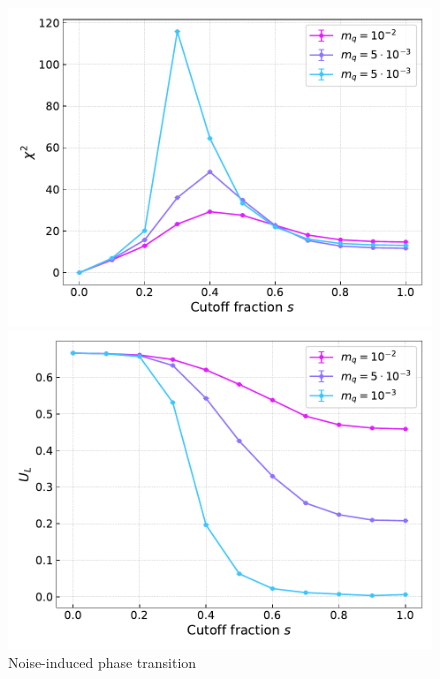 \begin{figure}[h]
\begin{minipage}{0.45\textwidth}
	\includegraphics[scale=0.48]{figures/chiral_PT/chi2.pdf}
\end{minipage}
\hfill
\begin{minipage}{0.45\textwidth}
	\includegraphics[scale=0.48]{figures/chiral_PT/binder.pdf}
\end{minipage}
\hfill
\caption{Noise-induced phase transition}
\label{fig:chiral:symmetry_breaking}
\end{figure}

\newpage

